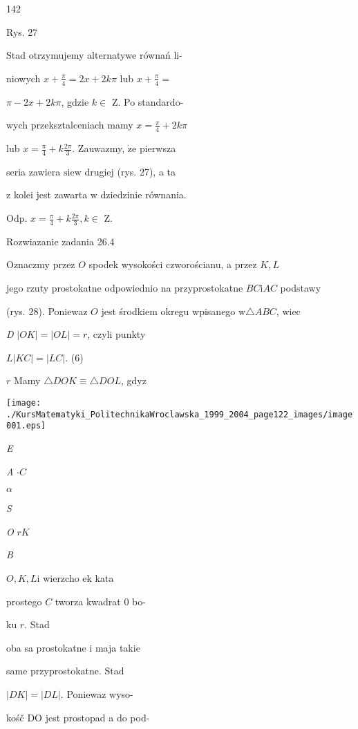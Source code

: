 \documentclass[a4paper,12pt]{article}
\begin{document}
142

Rys. 27

Stad otrzymujemy alternatywe równań li-

niowych $x+\displaystyle \frac{\pi}{4} =  2x+2k\pi$ lub $x+\displaystyle \frac{\pi}{4} =$

$\pi-2x+2k\pi$, gdzie $k \in$ Z. Po standardo-

wych przeksztalceniach mamy $x= \displaystyle \frac{\pi}{4}+2k\pi$

lub $x = \displaystyle \frac{\pi}{4}+k\frac{2\pi}{3}$. Zauwazmy, $\dot{\mathrm{z}}\mathrm{e}$ pierwsza

seria zawiera $\mathrm{s}\mathrm{i}\mathrm{e} \mathrm{w}$ drugiej (rys. 27), a ta

$\mathrm{z}$ kolei jest zawarta $\mathrm{w}$ dziedzinie równania.

Odp. $x=\displaystyle \frac{\pi}{4}+k\frac{2\pi}{3},  k\in$ Z.

Rozwiazanie zadania 26.4

Oznaczmy przez $O$ spodek wysokości czworościanu, a przez $K, L$

jego rzuty prostokatne odpowiednio na przyprostokatne $BC\mathrm{i}AC$ podstawy

(rys. 28). Poniewaz $O$ jest środkiem okregu wpisanego $\mathrm{w} \triangle ABC$, wiec

{\it D} $|OK| = |OL| = r$, czyli punkty

$L |KC|=|LC|$.   (6)

$r$ Mamy $\triangle DOK \equiv \triangle DOL$, gdyz
\begin{center}
\texttt{[image: ./KursMatematyki\_PolitechnikaWroclawska\_1999\_2004\_page122\_images/image001.eps]}
\end{center}
{\it E}

{\it A} $\cdot C$

$\alpha$

{\it S}

{\it O} $r K$

{\it B}

$O, K, L \mathrm{i}$ wierzcho ek kata

prostego $C$ tworza kwadrat $0$ bo-

ku $r$. Stad

oba sa prostokatne $\mathrm{i}$ maja takie

same przyprostokatne. Stad

$|DK| = |DL|$. Poniewaz wyso-

kośč DO jest prostopad a do pod-
\end{document}
